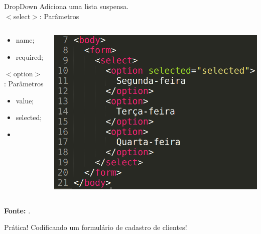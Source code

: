 \documentclass{beamer}
\begin{document}
\begin{frame}{DropDown}
  Adiciona uma lista suspensa. \\$<$select$>$: Parâmetros
    \begin{columns}
    \begin{column}{0.3 \textwidth}
      \small
     \begin{itemize}
       \item name;
        \item required;
     \end{itemize}
     $<$option$>$: Parâmetros
     \begin{itemize}
        \item value;
        \item selected;
        \item 
     \end{itemize}
    \end{column}
    
    \begin{column}{0.6\textwidth}
     \includegraphics[height=0.5\paperheight]{fig/aula3/aula4_12.png}
    \end{column}
  \end{columns}
  \tiny{\textbf{Fonte:} \cite{wschool2021html}}.
\end{frame}
\begin{frame}{Prática!}
\large
    Codificando um formulário de cadastro de clientes!
\end{frame}
\end{document}
